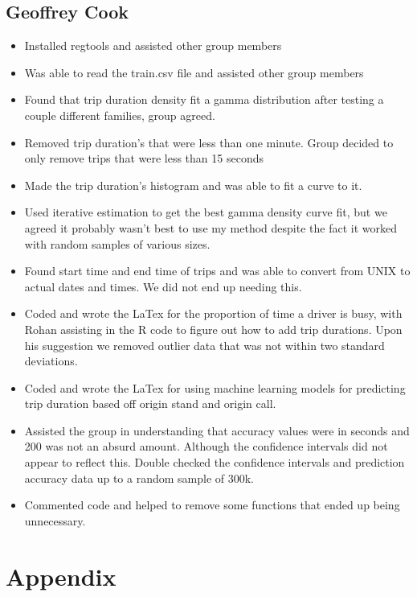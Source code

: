 \documentclass{article}
\numberwithin{equation}{section}
\begin{document}
\subsection{Geoffrey Cook}
\begin{itemize}
    \item Installed regtools and assisted other group members
    \item Was able to read the train.csv file and assisted other group members
    \item Found that trip duration density fit a gamma distribution after testing a couple different families, group agreed.
    \item Removed trip duration's that were less than one minute. Group decided to only remove trips that were less than 15 seconds
    \item Made the trip duration's histogram and was able to fit a curve to it.
    \item Used iterative estimation to get the best gamma density curve fit, but we agreed it probably wasn't best to use my method despite the fact it worked with random samples of various sizes.
    \item Found start time and end time of trips and was able to convert from UNIX to actual dates and times.  We did not end up needing this.
    \item Coded and wrote the LaTex for the proportion of time a driver is busy, with Rohan assisting in the R code to figure out how to add trip durations.  Upon his suggestion we removed outlier data that was not within two standard deviations.
    \item Coded and wrote the LaTex for using machine learning models for predicting trip duration based off origin stand and origin call.
    \item Assisted the group in understanding that accuracy values were in seconds and 200 was not an absurd amount.  Although the confidence intervals did not appear to reflect this.  Double checked the confidence intervals and prediction accuracy data up to a random sample of 300k.
    \item Commented code and helped to remove some functions that ended up being unnecessary.
\end{itemize}




\appendix{} \section{Appendix}
\end{document}
